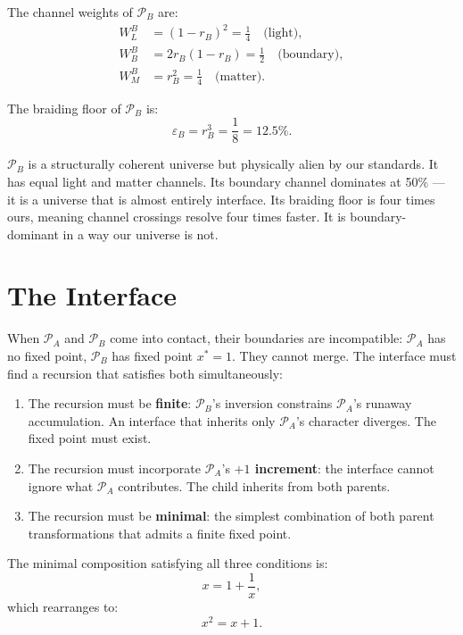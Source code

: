 \documentclass[prd,twocolumn,preprintnumbers,amsmath,amssymb]{revtex4-2}
\newcommand{\parentA}{\mathcal{P}_A}
\newcommand{\parentB}{\mathcal{P}_B}
\begin{document}
The channel weights of $\parentB$ are:
\begin{align}
  W_L^B &= (1-r_B)^2 = \tfrac{1}{4} \quad \text{(light)}, \\
  W_B^B &= 2r_B(1-r_B) = \tfrac{1}{2} \quad \text{(boundary)}, \\
  W_M^B &= r_B^2 = \tfrac{1}{4} \quad \text{(matter)}.
\end{align}

The braiding floor of $\parentB$ is:
\begin{equation}
  \varepsilon_B = r_B^3 = \frac{1}{8} = 12.5\%.
\end{equation}

$\parentB$ is a structurally coherent universe but physically alien
by our standards. It has equal light and matter channels. Its
boundary channel dominates at 50\% --- it is a universe that is
almost entirely interface. Its braiding floor is four times ours,
meaning channel crossings resolve four times faster. It is
boundary-dominant in a way our universe is not.

\section{The Interface}

When $\parentA$ and $\parentB$ come into contact, their boundaries
are incompatible: $\parentA$ has no fixed point, $\parentB$ has
fixed point $x^* = 1$. They cannot merge. The interface must find
a recursion that satisfies both simultaneously:

\begin{enumerate}
\item The recursion must be \textbf{finite}: $\parentB$'s inversion
      constrains $\parentA$'s runaway accumulation. An interface
      that inherits only $\parentA$'s character diverges. The
      fixed point must exist.
\item The recursion must incorporate $\parentA$'s \textbf{$+1$
      increment}: the interface cannot ignore what $\parentA$
      contributes. The child inherits from both parents.
\item The recursion must be \textbf{minimal}: the simplest
      combination of both parent transformations that admits
      a finite fixed point.
\end{enumerate}

The minimal composition satisfying all three conditions is:
\begin{equation}
  x = 1 + \frac{1}{x},
\end{equation}
which rearranges to:
\begin{equation}
  \boxed{x^2 = x + 1.}
  \label{eq:child}
\end{equation}
\end{document}
